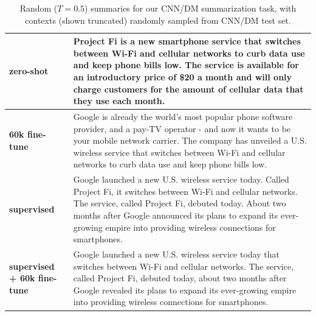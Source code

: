 \begin{table}[t]
\begin{center}
\begin{tabular}{|p{2cm}|p{12cm}|}
\textbf{zero-shot}
&
Project Fi is a new smartphone service that switches between Wi-Fi and cellular networks to curb data use and keep phone bills low. The service is available for an introductory price of \$20 a month and will only charge customers for the amount of cellular data that they use each month.
\\
\hline
\textbf{60k fine-tune}
&
Google is already the world's most popular phone software provider, and a pay-TV operator - and now it wants to be your mobile network carrier.
\newline\newline
The company has unveiled a U.S. wireless service that switches between Wi-Fi and cellular networks to curb data use and keep phone bills low.
\\
\hline
\textbf{supervised}
&
Google launched a new U.S. wireless service today. Called \textquotesingle{}Project Fi,\textquotesingle{} it switches between Wi-Fi and cellular networks. The service, called \textquotesingle{}Project Fi,\textquotesingle{} debuted today. About two months after Google announced its plans to expand its ever-growing empire into providing wireless connections for smartphones.
\\
\hline
\textbf{supervised + 60k fine-tune}
&
Google launched a new U.S. wireless service today that switches between Wi-Fi and cellular networks. The service, called \textquotesingle{}Project Fi,\textquotesingle{} debuted today, about two months after Google revealed its plans to expand its ever-growing empire into providing wireless connections for smartphones.
\\
\hline


\end{tabular}
\caption{Random ($T=0.5$) summaries for our CNN/DM summarization task, with contexts (shown truncated) randomly sampled from CNN/DM test set.}
\label{tab:samples-summarization-cnndm}
\end{center}
\end{table}
    

